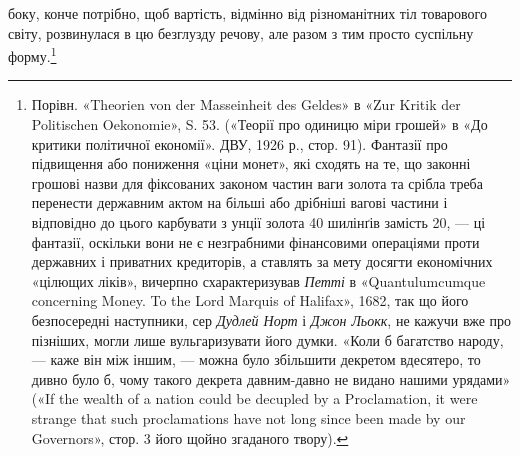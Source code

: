 \parcont{}  %
боку, конче потрібно, щоб вартість, відмінно від різноманітних
тіл товарового світу, розвинулася в цю безглузду речову, але
разом з тим просто суспільну форму.\footnote{
Порівн. «Theorien von der Masseinheit des Geldes» в «Zur Kritik
der Politischen Oekonomie», S. 53. («Теорії про одиницю міри грошей»
в «До критики політичної економії». ДВУ, 1926 р., стор. 91). Фантазії
про підвищення або пониження «ціни монет», які сходять на те, що законні
грошові назви для фіксованих законом частин ваги золота та срібла
треба перенести державним актом на більші або дрібніші вагові частини
і відповідно до цього карбувати з  унції золота 40 шилінґів замість 20, —
ці фантазії, оскільки вони не є незграбними фінансовими операціями проти
державних і приватних кредиторів, а ставлять за мету досягти економічних
«цілющих ліків», вичерпно схарактеризував \emph{Петті} в «Quantulumcumque
concerning Money. To the Lord Marquis of Halifax», 1682, так
що його безпосередні наступники, сер \emph{Дудлей Норт} і \emph{Джон Льокк},
не кажучи вже про пізніших, могли лише вульгаризувати його
думки. «Коли б багатство народу, — каже він між іншим, — можна
було збільшити декретом вдесятеро, то дивно було б, чому такого декрета
давним-давно не видано нашими урядами» («If the wealth of a nation
could be decupled by a Proclamation, it were strange that such proclamations
have not long since been made by our Governors», стор. 3 його щойно згаданого
твору).
}

